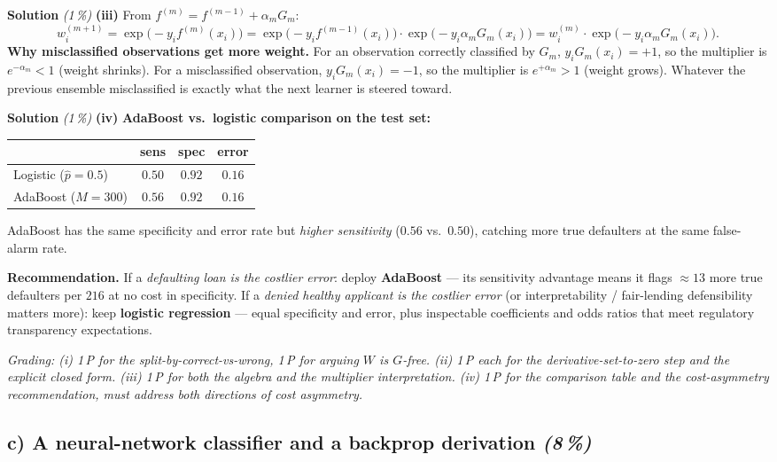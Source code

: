 \documentclass[11pt,a4paper]{article}
\newcommand{\subpoints}[1]{\textit{(#1\,\%)}}
\newcommand{\sol}{\noindent\textbf{Solution}}
\begin{document}
\medskip
\sol{} \subpoints{1} \textbf{(iii)} From $f^{(m)} = f^{(m-1)} + \alpha_m G_m$:
$$w_i^{(m+1)} = \exp\!\bigl(-y_i f^{(m)}(x_i)\bigr)
   = \exp\!\bigl(-y_i f^{(m-1)}(x_i)\bigr)\cdot\exp\!\bigl(-y_i \alpha_m G_m(x_i)\bigr)
   = w_i^{(m)}\cdot\exp\!\bigl(-y_i \alpha_m G_m(x_i)\bigr).$$
\textbf{Why misclassified observations get more weight.} For an observation correctly classified by
$G_m$, $y_i G_m(x_i) = +1$, so the multiplier is $e^{-\alpha_m} < 1$ (weight shrinks). For a
misclassified observation, $y_i G_m(x_i) = -1$, so the multiplier is $e^{+\alpha_m} > 1$ (weight
grows). Whatever the previous ensemble misclassified is exactly what the next learner is steered
toward.

\medskip
\sol{} \subpoints{1} \textbf{(iv)} \textbf{AdaBoost vs.\ logistic comparison on the test set:}
\begin{center}\small
\begin{tabular}{lccc}
\toprule
                    & sens   & spec   & error \\
\midrule
Logistic ($\hat p = 0.5$) & $0.50$ & $0.92$ & $0.16$ \\
AdaBoost ($M = 300$)      & $0.56$ & $0.92$ & $0.16$ \\
\bottomrule
\end{tabular}
\end{center}
AdaBoost has the same specificity and error rate but \emph{higher sensitivity} ($0.56$ vs.\ $0.50$),
catching more true defaulters at the same false-alarm rate.

\textbf{Recommendation.} If a \emph{defaulting loan is the costlier error}: deploy \textbf{AdaBoost}
--- its sensitivity advantage means it flags $\approx 13$ more true defaulters per $216$ at no cost
in specificity. If a \emph{denied healthy applicant is the costlier error} (or interpretability /
fair-lending defensibility matters more): keep \textbf{logistic regression} --- equal specificity
and error, plus inspectable coefficients and odds ratios that meet regulatory transparency
expectations.

\noindent\emph{Grading: (i) 1\,P for the split-by-correct-vs-wrong, 1\,P for arguing $W$ is
$G$-free. (ii) 1\,P each for the derivative-set-to-zero step and the explicit closed form.
(iii) 1\,P for both the algebra and the multiplier interpretation. (iv) 1\,P for the comparison
table and the cost-asymmetry recommendation, must address \emph{both} directions of cost
asymmetry.}

\subsection*{c) A neural-network classifier and a backprop derivation \subpoints{8}}
\end{document}
